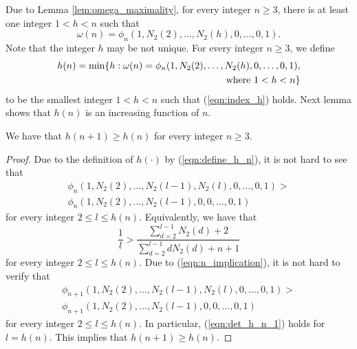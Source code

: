 \documentclass[JMC]{degruyter-journal}
\begin{document}
Due to Lemma  \ref{lem:omega_maximality}, for every integer $n\geq
3$, there is at least one integer $1<h<n$ such that
\begin{equation}\label{eqn:index_h}
\omega(n)=\phi_n(1,N_2(2),\ldots, N_2(h), 0,\ldots, 0,1).
\end{equation}
Note that the integer $h$ may be not unique. For every integer
$n\geq 3$, we define
\begin{equation}\label{eqn:define_h_n}
\begin{split}
h(n)=\min\{h: \omega(n)=
\phi_n(1,N_2(2),\ldots, N_2(h), 0,
\ldots, 0,1), \\ {\rm ~where~} 1<h<n\}
\end{split}
\end{equation}
to be the smallest integer $1<h<n$ such that
(\ref{eqn:index_h}) holds.
 Next lemma shows that $h(n)$ is an increasing  function of $n$.
\begin{lemma}\label{lem:h_n_is_increasing}
We have that $h(n+1)\geq h(n)$ for every  integer $n\geq 3$.
\end{lemma}
\begin{proof}
Due to the definition of $h(\cdot)$ by
(\ref{eqn:define_h_n}), it is not hard to see that
\begin{equation*}
\begin{split}
\phi_n(1,N_2(2),\ldots,N_2(l-1), N_2(l), 0,\ldots,0,1)>\\
\phi_n(1,N_2(2),\ldots, N_2(l-1),0, 0,\ldots,0,1)
\end{split}
\end{equation*}
 for every
integer $2\leq l\leq h(n)$. Equivalently, we have that
\begin{equation}\label{eqn:n_implication}
\frac{1}{l}>\frac{
\sum_{d=2}^{l-1}N_2(d)+2}{\sum_{d=2}^{l-1}dN_2(d)+n+1}
\end{equation}
for every integer $2\leq l\leq h(n)$. Due to 
(\ref{eqn:n_implication}), it is not hard to verify that
\begin{equation}\label{eqn:det_h_n_1}
\begin{split}
\phi_{n+1}(1,N_2(2),\ldots, N_2(l-1), N_2(l), 0,\ldots,0,1)>\\
\phi_{n+1}(1,N_2(2),\ldots, N_2(l-1),0,0,\ldots,0,1)
\end{split}
\end{equation}
for every integer $2\leq l\leq h(n)$. In particular, 
(\ref{eqn:det_h_n_1}) holds for $l=h(n)$. This implies that $h(n+1)\geq h(n)$.
\end{proof}
\end{document}
